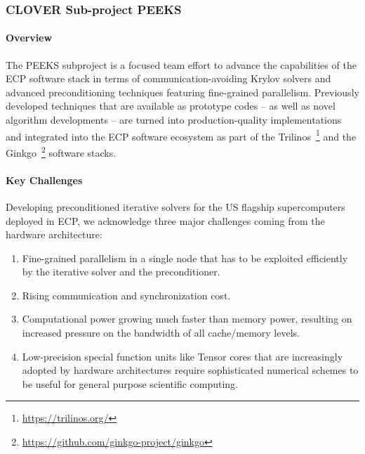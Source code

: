 \subsubsection{ CLOVER Sub-project PEEKS} 
\paragraph{Overview} 
The PEEKS subproject is a focused team effort to advance the capabilities of the
ECP software stack in terms of communication-avoiding Krylov solvers and
advanced preconditioning techniques featuring fine-grained parallelism.
Previously developed techniques that are available as prototype codes -- as
well as novel algorithm developments -- are turned into production-quality 
implementations and integrated into the ECP software ecosystem 
as part of the Trilinos~\footnote{\url{https://trilinos.org/}} and the  
Ginkgo~\footnote{\url{https://github.com/ginkgo-project/ginkgo}} software 
stacks. 


\paragraph{Key  Challenges}
Developing preconditioned iterative solvers for the US flagship supercomputers 
deployed in ECP, we acknowledge three major challenges coming from the hardware 
architecture:
\begin{enumerate}
\item 
Fine-grained parallelism in a single node that has to be exploited efficiently 
by the iterative solver and the preconditioner.
\item
Rising communication and synchronization cost.
\item
Computational power growing much faster than memory power, resulting on 
increased pressure on the bandwidth of all cache/memory levels.
\item 
Low-precision special function units like Tensor cores that are increasingly 
adopted by hardware architectures require sophisticated numerical schemes to be 
useful for general purpose scientific computing.
\end{enumerate}

